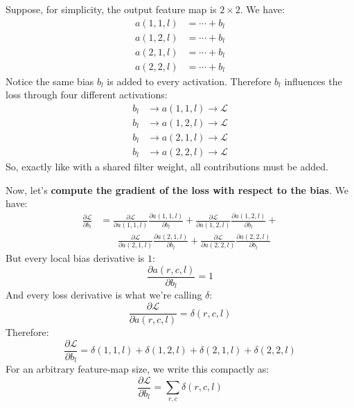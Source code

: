 \newpage

\begin{examplebox}
    Suppose, for simplicity, the output feature map is $2\times2$. We have:
    \begin{align*}
        a(1,1,l) &= \cdots + b_l\\
        a(1,2,l) &= \cdots + b_l\\
        a(2,1,l) &= \cdots + b_l\\
        a(2,2,l) &= \cdots + b_l
    \end{align*}
    Notice the same bias $b_l$ is added to every activation. Therefore $b_l$ influences the loss through four different activations:
    \begin{align*}
        b_l &\rightarrow a(1,1,l) \rightarrow \mathcal L\\
        b_l &\rightarrow a(1,2,l) \rightarrow \mathcal L\\
        b_l &\rightarrow a(2,1,l) \rightarrow \mathcal L\\
        b_l &\rightarrow a(2,2,l) \rightarrow \mathcal L
    \end{align*}
    So, exactly like with a shared filter weight, all contributions must be added.

    \highspace
    Now, let's \textbf{compute the gradient of the loss with respect to the bias}. We have:
    \begin{align*}
        \frac{\partial\mathcal L}{\partial b_l} &=
        \frac{\partial\mathcal L}{\partial a(1,1,l)}
        \frac{\partial a(1,1,l)}{\partial b_l}
        +
        \frac{\partial\mathcal L}{\partial a(1,2,l)}
        \frac{\partial a(1,2,l)}{\partial b_l} + \\
        &\phantom{=} \,\,\,
        \frac{\partial\mathcal L}{\partial a(2,1,l)}
        \frac{\partial a(2,1,l)}{\partial b_l}
        +
        \frac{\partial\mathcal L}{\partial a(2,2,l)}
        \frac{\partial a(2,2,l)}{\partial b_l}
    \end{align*}
    But every local bias derivative is $1$:
    \begin{equation*}
        \frac{\partial a(r,c,l)}{\partial b_l}=1
    \end{equation*}
    And every loss derivative is what we're calling $\delta$:
    \begin{equation*}
        \frac{\partial\mathcal L}{\partial a(r,c,l)}
        =
        \delta(r,c,l)
    \end{equation*}
    Therefore:
    \begin{equation*}
        \frac{\partial\mathcal L}{\partial b_l}
        =
        \delta(1,1,l)
        +
        \delta(1,2,l)
        +
        \delta(2,1,l)
        +
        \delta(2,2,l)
    \end{equation*}
    For an arbitrary feature-map size, we write this compactly as:
    \begin{equation*}
        \frac{\partial\mathcal L}{\partial b_l}
        =
        \sum_{r,c}\delta(r,c,l)
    \end{equation*}
\end{examplebox}

